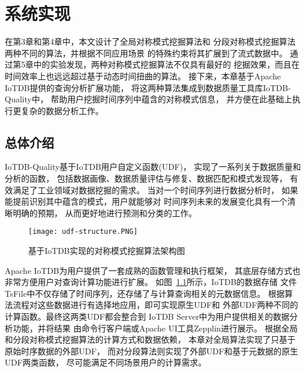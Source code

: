 
\chapter{系统实现}
在第3章和第4章中，本文设计了全局对称模式挖掘算法和
分段对称模式挖掘算法两种不同的算法，并根据不同应用场景
的特殊约束将其扩展到了流式数据中。
通过第5章中的实验发现，两种对称模式挖掘算法不仅具有最好的
挖掘效果，而且在时间效率上也远远超过基于动态时间扭曲的算法。
接下来，本章基于Apache IoTDB提供的查询分析扩展功能，
将这两种算法集成到数据质量工具库IoTDB-Quality中，
帮助用户挖掘时间序列中蕴含的对称模式信息，
并方便在此基础上执行更复杂的数据分析工作。

\section{总体介绍}
IoTDB-Quality基于IoTDB用户自定义函数(UDF)，
实现了一系列关于数据质量和分析的函数，
包括数据画像、数据质量评估与修复、数据匹配和模式发现等，
有效满足了工业领域对数据挖掘的需求。
当对一个时间序列进行数据分析时，
如果能提前识别其中蕴含的模式，用户就能够对
时间序列未来的发展变化具有一个清晰明确的预期，
从而更好地进行预测和分类的工作。

\begin{figure}
    \centering
    \texttt{[image: udf-structure.PNG]}
    \caption{基于IoTDB实现的对称模式挖掘算法架构图}
    \label{fig:symmetry_structure}
\end{figure}

Apache IoTDB为用户提供了一套成熟的函数管理和执行框架，
其底层存储方式也非常方便用户对查询计算功能进行扩展。
如图~\ref{fig:symmetry_structure}所示，IoTDB的数据存储
文件TsFile中不仅存储了时间序列，还存储了与计算查询相关的元数据信息。
根据算法流程对这些数据进行有选择地应用，即可实现原生UDF和
外部UDF两种不同的计算函数。最终这两类UDF都会整合到
IoTDB Server中为用户提供相关的数据分析功能，并将结果
由命令行客户端或Apache UI工具Zepplin进行展示。
根据全局和分段对称模式挖掘算法的计算方式和数据依赖，
本章对全局算法实现了只基于原始时序数据的外部UDF，
而对分段算法则实现了外部UDF和基于元数据的原生UDF两类函数，
尽可能满足不同场景用户的计算需求。


